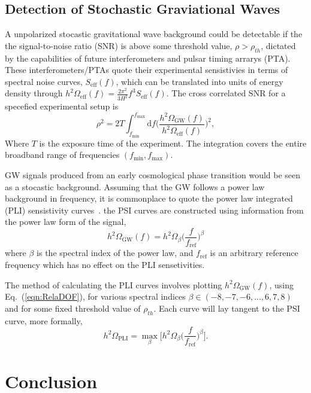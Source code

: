 \documentclass[nofootinbib,twocolumn,preprintnumbers]{revtex4-1}
\begin{document}
\subsection{Detection of Stochastic Graviational Waves}

A unpolarized stocastic gravitational wave background could be detectable if the the signal-to-noise ratio (SNR) is above some threshold value, $\rho > \rho_{th}$, dictated by the capabilities of future interferometers and pulsar timing arrarys (PTA). These interferometers/PTAs quote their experimental sensistivies in terms of spectral noise curves, $S_{\textrm{eff}}(f)$, which can be translated into units of energy density through $h^2 \Omega_{\textrm{eff}}(f) = \frac{2\pi^2}{3H^2}f^3 S_{\textrm{eff}}(f)$. The cross correlated SNR for a specefied experimental setup is~\cite{PhysRevD.59.102001}
\begin{equation}\label{eqn::SNR}
\rho^2 = 2 T \int_{f_{\textrm{min}}}^{f_{\textrm{max}}}\textrm{d}f \bigg( \frac{h^2 \Omega_{\textrm{GW}}(f)}{h^2 \Omega_{\textrm{eff}}(f)} \bigg)^2,
\end{equation}
Where $T$ is the exposure time of the experiment. The integration covers the entire broadband range of frequencies $(f_{\textrm{min}}, f_{\textrm{max}})$. 


GW signals produced from an early cosmological phase transition would be seen as a stocastic background. Assuming that the GW follows a power law background in frequency, it is commonplace to quote the power law integrated (PLI) sensistivity curves~\cite{PhysRevD.88.124032}. the PSI curves are constructed using information from the power law form of the signal,
\begin{equation}
h^2 \Omega_{\textrm{GW}}(f) = h^2 \Omega_{\beta}  \bigg(\frac{f}{f_{\textrm{ref}}}\bigg)^{\beta}
\end{equation}
where $\beta$ is the spectral index of the power law, and $f_{\textrm{ref}}$ is an arbitrary reference frequency which has no effect on the PLI sensetivities. 

The method of calculating the PLI curves involves plotting $h^2 \Omega_{\textrm{GW}}(f) $, using Eq.~(\ref{eqn:RelaDOF}), for various spectral indices $\beta \in (-8,-7,-6, ... , 6, 7, 8)$ and for some fixed threshold value of $\rho_{th}$. Each curve will lay tangent to the PSI curve, more formally,
\begin{equation}
h^2 \Omega_{\textrm{PLI}} = \max\limits_{\beta}\bigg[ h^2 \Omega_{\beta}\bigg(\frac{f}{f_{\textrm{ref}}}\bigg)^{\beta}  \bigg].
\end{equation}


\section{Conclusion}
\label{sec:conclusion}


\appendix



\end{document}
